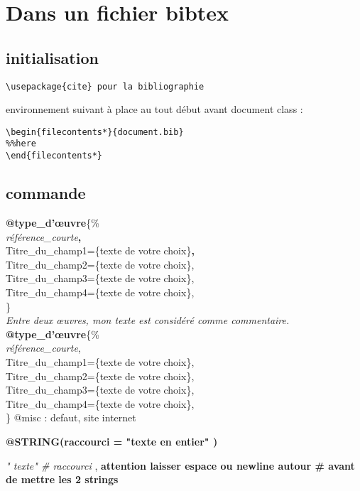 \chapter{Dans un fichier bibtex}

\section{initialisation}
\begin{verbatim}
\usepackage{cite} pour la bibliographie
\end{verbatim}

environnement suivant à place au tout début avant document class :
\begin{verbatim}
\begin{filecontents*}{document.bib}
%%here
\end{filecontents*}
\end{verbatim}

\section{commande}

\textbf{@type\_d'œuvre}\{\%\\
\textsl{référence\_courte}\textbf{,} \\
Titre\_du\_champ1=\{texte de votre choix\}\textbf{,} \\
Titre\_du\_champ2=\{texte de votre choix\},\\
Titre\_du\_champ3=\{texte de votre choix\},\\
Titre\_du\_champ4=\{texte de votre choix\},\\
\}\\
\textit{Entre deux œuvres, mon texte est considéré comme commentaire.\\}
\textbf{@type\_d'œuvre}\{\%
\\\textsl{référence\_courte},\\
Titre\_du\_champ1=\{texte de votre choix\},\\
Titre\_du\_champ2=\{texte de votre choix\},\\
Titre\_du\_champ3=\{texte de votre choix\},\\
Titre\_du\_champ4=\{texte de votre choix\},\\
\}
@misc : defaut, site internet

\textbf{@STRING(raccourci = "texte en entier" )}

\textit{" texte" \# raccourci }, \textbf{attention laisser espace ou newline autour \# avant de mettre les 2 strings}

